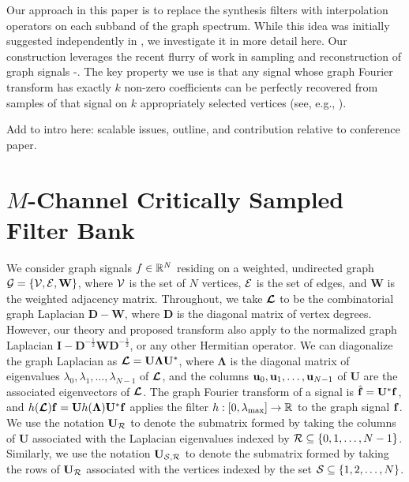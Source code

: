 \documentclass[journal, 10pt]{IEEEtran}
\begin{document}
Our approach in this paper is to replace the synthesis filters with interpolation operators on each subband of the graph spectrum. While this idea was initially suggested independently in \cite{chen2015discrete}, we investigate it in more detail here. Our construction leverages the recent flurry of work in sampling and reconstruction of graph signals \cite{chen2015discrete}-\nocite{pesenson_paley,narang2013interpolation,anis2014towards,gadde2015probabilistic,shomorony,PuyTGV15,chen2015signal,tsitsvero2016uncertainty}\cite{anis2016efficient}. The key property we use is that any signal whose graph Fourier transform has exactly $k$ non-zero coefficients can be perfectly recovered from samples of that signal on $k$ appropriately selected vertices (see, e.g., \cite[Theorem 1]{chen2015discrete} \cite[Proposition 1]{anis2016efficient}).

{\color{red} Add to intro here: scalable issues, outline, and contribution relative to conference paper.}


\section{$M$-Channel Critically Sampled Filter Bank}
We consider graph signals $f \in \mathbb{R}^N$ residing on a weighted, undirected graph ${\mathcal{G}}=\{{\mathcal{V}},{\mathcal{E}},\mathbf{W}\}$, where ${\mathcal{V}}$ is the set of $N$ vertices, ${\mathcal{E}}$ is the set of edges, and $\mathbf{W}$ is the weighted adjacency matrix. 
Throughout, we take $\boldsymbol{\mathcal{L}}$ to be the combinatorial graph Laplacian $\mathbf{D}-\mathbf{W}$, where $\mathbf{D}$ is the diagonal matrix of vertex degrees. However, our theory and proposed transform also apply to the normalized graph Laplacian $\mathbf{I}-\mathbf{D}^{-\frac{1}{2}}\mathbf{W}\mathbf{D}^{-\frac{1}{2}}$, or any other Hermitian operator. We can diagonalize the graph Laplacian as $\boldsymbol{\mathcal{L}}=\mathbf{U}{\boldsymbol \Lambda}\mathbf{U}^{*}$, where ${\boldsymbol \Lambda}$ is the diagonal matrix of eigenvalues $\lambda_0,\lambda_1,\ldots,\lambda_{N-1}$ of $\boldsymbol{\mathcal{L}}$, and the columns ${\bf u}_0,{\bf u}_1,\ldots,{\bf u}_{N-1}$ of $\mathbf{U}$ are the associated eigenvectors of $\boldsymbol{\mathcal{L}}$. The graph Fourier transform of a signal is $\hat{\bf{f}}=\mathbf{U}^{*}{\bf f}$, and ${h}(\boldsymbol{\mathcal{L}}){\bf f}=\mathbf{U}{h}({\boldsymbol \Lambda})\mathbf{U}^{*}{\bf f}$ applies the filter ${h}: [0,\lambda_{\max}] \rightarrow \mathbb{R}$ to the graph signal ${\bf f}$. We use the notation $\mathbf{U}_{{\cal R}}$ to denote the submatrix formed by taking the columns of $\mathbf{U}$ associated with the Laplacian eigenvalues indexed by ${\cal R} \subseteq \{0,1,\ldots,N-1\}$. Similarly, we use the notation $\mathbf{U}_{{\cal S},{\cal R}}$ to denote the submatrix  formed by taking the rows of $\mathbf{U}_{{\cal R}}$ associated with the vertices indexed by the set ${\cal S} \subseteq \{1,2,\ldots,N\}$.
\end{document}
